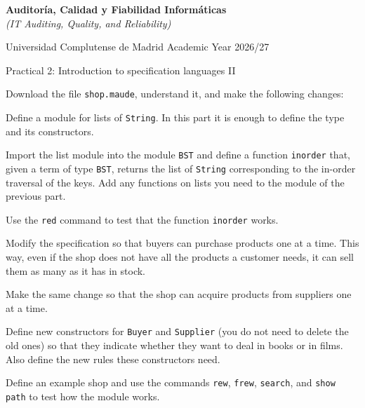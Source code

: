 

\usepackage{pgf}
\usepackage{tikz}
\usepackage{pstricks,pst-node,pst-tree,pstricks-add}



\begin{center}
{\Large\textbf{Auditor\'ia, Calidad y Fiabilidad Inform\'aticas}}\\[2pt]
\textit{(IT Auditing, Quality, and Reliability)}
\smallskip

\large
Universidad Complutense de Madrid \qquad Academic Year 2026/27
\medskip

Practical 2: Introduction to specification languages II\hfill\mbox{}

\noindent\hrulefill
\end{center}

Download the file \verb"shop.maude", understand it, and make the following
changes:

\begin{listaejercicios}

\item
Define a module for lists of \texttt{String}. In this part it is enough to
define the type and its constructors.

\item
Import the list module into the module \verb"BST" and define a function
\verb"inorder" that, given a term of type \verb"BST", returns the list of
\texttt{String} corresponding to the in-order traversal of the keys. Add any
functions on lists you need to the module of the previous part.

\item
Use the \verb"red" command to test that the function \verb"inorder" works.

\item
Modify the specification so that buyers can purchase products one at a time.
This way, even if the shop does not have all the products a customer needs,
it can sell them as many as it has in stock.

\item
Make the same change so that the shop can acquire products from suppliers
one at a time.

\item
Define new constructors for \verb"Buyer" and \verb"Supplier" (you do not need
to delete the old ones) so that they indicate whether they want to deal in
books or in films. Also define the new rules these constructors need.

\item
Define an example shop and use the commands \verb"rew", \verb"frew",
\verb"search", and \verb"show path" to test how the module works.

\end{listaejercicios}


